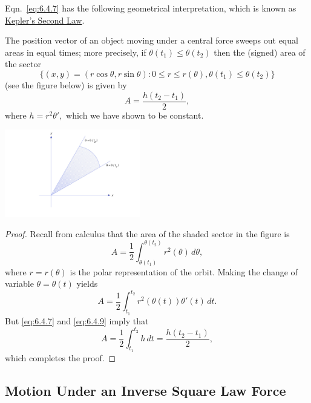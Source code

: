 \documentclass{ximera}
\begin{document}
Eqn.~\eqref{eq:6.4.7} has the following geometrical interpretation, which
is known as
\href{http://www-history.mcs.st-and.ac.uk/Mathematicians/Kepler.html}{Kepler's Second Law}.

\begin{theorem}\label{thmtype:6.4.1}
 The position vector
 of an object moving under a central force
sweeps out equal areas in equal times; more precisely, if
$\theta(t_1)\leq\theta(t_2)$ then the (signed) area of the sector
$$
\{(x,y)=(r\cos\theta,r\sin\theta)  :  0\leq r\leq r(\theta),
\theta(t_1)\leq\theta(t_2)\}
$$
(see the figure below) is given by
$$
A=\frac{h(t_2-t_1)}{2},
$$
where $h=r^2\theta',$ which we have shown to be constant.
\end{theorem}

\begin{image}
 \includegraphics[height=1.5in]{fig060403.jpg}
 \end{image}

\begin{proof}  Recall from calculus that the area of the shaded sector
in the figure is
$$
A=\frac{1}{2}\int_{\theta(t_1)}^{\theta(t_2)} r^2(\theta)\,d\theta,
$$
where $r=r(\theta)$ is the polar representation of the orbit.
Making the change of variable $\theta=\theta(t)$ yields
\begin{equation} \label{eq:6.4.9}
A=\frac{1}{2}\int_{t_1}^{t_2} r^2(\theta(t))\theta'(t)\,dt.
\end{equation}
 But
\eqref{eq:6.4.7}  and \eqref{eq:6.4.9} imply that
$$
A=\frac{1}{2}\int_{t_1}^{t_2} h\,dt=\frac{h(t_2-t_1)}{2},
$$
which completes the proof.
\end{proof}

\subsection*{Motion Under an Inverse Square Law Force}
\end{document}

